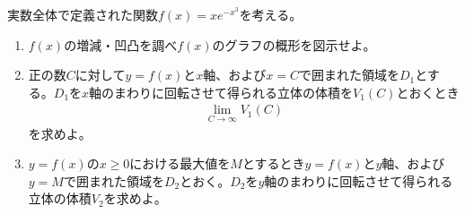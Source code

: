 実数全体で定義された関数$f(x) = xe^{-x^3}$を考える。

\begin{enumerate}
  \item $f(x)$の増減・凹凸を調べ$f(x)$のグラフの概形を図示せよ。
  \item 正の数$C$に対して$y=f(x)$と$x$軸、および$x = C$で囲まれた領域を$D_1$とする。$D_1$を$x$軸のまわりに回転させて得られる立体の体積を$V_1(C)$とおくとき
        \begin{align}
          \lim_{C \to \infty} V_1(C)
        \end{align}
        を求めよ。
  \item $y = f(x)$の$x \geq 0$における最大値を$M$とするとき$y = f(x)$と$y$軸、および$y = M$で囲まれた領域を$D_2$とおく。$D_2$を$y$軸のまわりに回転させて得られる立体の体積$V_2$を求めよ。
\end{enumerate}